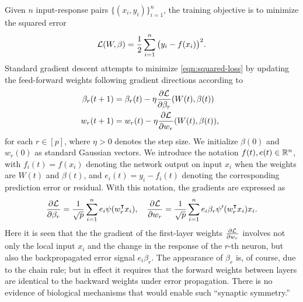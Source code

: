Given $n$ input-response pairs $\{(x_i,y_i)\}_{i=1}^n$, the training objective is to minimize the squared error
\begin{equation}\label{eqn:squared-loss}
    \Loss(W,\beta) = \frac{1}{2}\sum_{i=1}^n \big(y_i - f(x_i)\big)^2.
\end{equation}
Standard gradient descent attempts to minimize \eqref{eqn:squared-loss} by updating the feed-forward weights following gradient directions according to
\begin{align*}
    \beta_r(t+1) &= \beta_r(t)-\eta\frac{\partial\Loss}{\partial \beta_r}(W(t),\beta(t)) \quad\\ w_r(t+1) &= w_r(t)-\eta\frac{\partial\Loss}{\partial w_r}(W(t),\beta(t)),
\end{align*}
for each $r\in[p]$, where $\eta>0$ denotes the step size. We initialize $\beta(0)$ and $w_r(0)$ as standard Gaussian vectors. We introduce the notation $f(t), e(t)\in \mathbb{R}^n$, with $f_i(t) = f(x_i)$ denoting the network output on input $x_i$ when the weights are $W(t)$ and $\beta(t)$, and $e_i(t) = y_i-f_i(t)$ denoting the corresponding prediction error or residual. With this notation,
the gradients are expressed as
\begin{equation*}
    \frac{\partial\Loss}{\partial \beta_r} = \frac{1}{\sqrt p}\sum_{i=1}^n e_i\psi(w_r\transpose x_i), \quad
    \frac{\partial\Loss}{\partial w_r} = \frac{1}{\sqrt p} \sum_{i=1}^n e_i \beta_r\psi'(w_r\transpose x_i)x_i.
\end{equation*}
Here it is seen that the the gradient of the first-layer weights $\frac{\partial \mathcal{L}}{\partial w_r}$ involves not only the local input $x_i$ and the change in
the response of the $r$-th neuron, but also the backpropagated error signal $e_i\beta_r$.
The appearance of $\beta_r$ is, of course, due to the chain rule; but in effect it requires that the forward weights between layers are identical to the backward weights under error propagation. There is no evidence of biological mechanisms that would enable such ``synaptic symmetry.''


